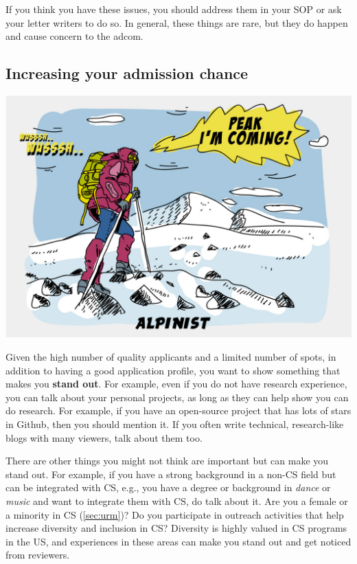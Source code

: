 \documentclass[oneside,11pt,dvipsnames]{book}
\def\subsectioninfo#1{%
    \addcontentsline{toc}{subsectioninfo}{%
    \noexpand\numberline{}\color{black}{#1}}%
}
\begin{document}
If you think you have these issues, you should address them in your SOP or ask your letter writers to do so.
In general, these things are rare, but they do happen and cause concern to the adcom.





\subsection{Increasing your admission chance}\label{sec:improve-your-chance}
\subsectioninfo{You can improve your profile by being unique and standing out.}

\begin{center}
  \includegraphics[scale=0.2]{files/alpinist-climbing-peak-mountain-comic-hand-drawn-vector-illustration.jpg}
\end{center}


Given the high number of quality applicants and a limited number of spots, in addition to having a good application profile, you want to show something that makes you \textbf{stand out}.  For example, even if you do not have research experience, you can talk about your personal projects, as long as they can help show you can do research. For example, if you have an open-source project that has lots of stars in Github, then you should mention it. If you often write technical, research-like blogs with many viewers, talk about them too.

There are other things you might not think are important but can make you stand out. For example, if you have a strong background in a non-CS field but can be integrated with CS, e.g., you have a degree or background in \emph{dance} or \emph{music} and want to integrate them with CS, do talk about it. Are you a female or a minority in CS (\autoref{sec:urm})? Do you participate in outreach activities that help increase diversity and inclusion in CS? Diversity is highly valued in CS programs in the US, and experiences in these areas can make you stand out and get noticed from reviewers.
\end{document}

